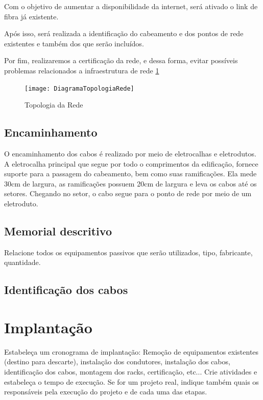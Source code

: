 \documentclass[	DIV=calc,%
							paper=a4,%
							fontsize=12pt,%
							onecolumn]{scrartcl}	 					%
\begin{document}
Com o objetivo de aumentar a disponibilidade da internet, será ativado o link de fibra já existente.

Após isso, será realizada a identificação do cabeamento e dos pontos de rede existentes e também dos que serão incluídos.

Por fim, realizaremos a certificação da rede, e dessa forma, evitar possíveis problemas relacionados a infraestrutura de rede \ref{DiagramaTopologiaRede}


\begin{figure}[h!]
	\centering
	\texttt{[image: DiagramaTopologiaRede]}
	\caption{Topologia da Rede}
	\label{DiagramaTopologiaRede}
\end{figure}


\subsection{Encaminhamento}



O encaminhamento dos cabos é realizado por meio de eletrocalhas e eletrodutos. A eletrocalha principal que segue por todo o comprimentos da edificação, fornece suporte para a passagem do cabeamento, bem como suas ramificações. Ela mede 30cm de largura, as ramificações possuem 20cm de largura e leva os cabos até os setores. Chegando no setor, o cabo segue para o ponto de rede por meio de um eletroduto.




\subsection{Memorial descritivo}

Relacione todos os equipamentos passivos que serão utilizados, tipo, fabricante, quantidade.

\subsection{Identificação dos cabos}

\section{Implantação}
Estabeleça um cronograma de implantação:
Remoção de equipamentos existentes (destino para descarte), instalação dos condutores, instalação dos cabos, 
identificação dos cabos, montagem dos racks, certificação, etc... Crie atividades e estabeleça o tempo de execução. Se for um projeto real, indique também quais os responsáveis pela execução do projeto e de cada uma das etapas.
\end{document}
